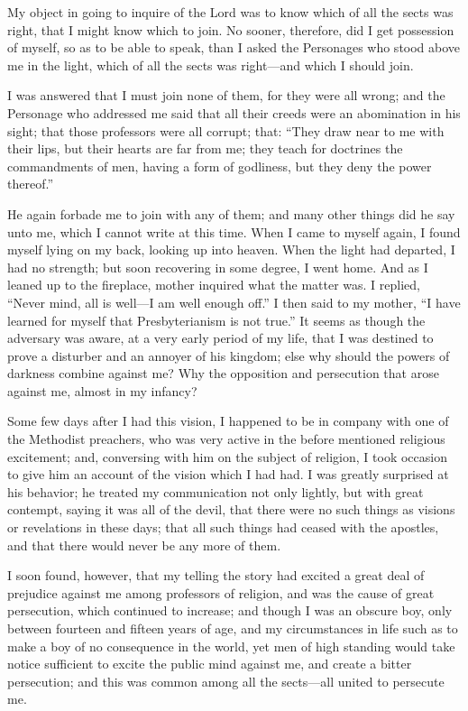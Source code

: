 My object in going to inquire of the Lord was to know which of all the sects was right, that I
might know which to join. No sooner, therefore, did I get possession of myself, so as to be
able to speak, than I asked the Personages who stood above me in the light, which of all the
sects was right—and which I should join.

I was answered that I must join none of them, for they were all wrong; and the Personage
who addressed me said that all their creeds were an abomination in his sight; that those
professors were all corrupt; that: ``They draw near to me with their lips, but their hearts are
far from me; they teach for doctrines the commandments of men, having a form of godliness,
but they deny the power thereof.''

He again forbade me to join with any of them; and many other things did he say unto me,
which I cannot write at this time. When I came to myself again, I found myself lying on my
back, looking up into heaven. When the light had departed, I had no strength; but soon
recovering in some degree, I went home. And as I leaned up to the fireplace, mother inquired
what the matter was. I replied, ``Never mind, all is well—I am well enough off.'' I then said to
my mother, ``I have learned for myself that Presbyterianism is not true.'' It seems as though
the adversary was aware, at a very early period of my life, that I was destined to prove a
disturber and an annoyer of his kingdom; else why should the powers of darkness combine
against me? Why the opposition and persecution that arose against me, almost in my
infancy?

Some few days after I had this vision, I happened to be in company with one of the
Methodist preachers, who was very active in the before mentioned religious excitement; and,
conversing with him on the subject of religion, I took occasion to give him an account of the
vision which I had had. I was greatly surprised at his behavior; he treated my communication
not only lightly, but with great contempt, saying it was all of the devil, that there were no
such things as visions or revelations in these days; that all such things had ceased with the
apostles, and that there would never be any more of them.

I soon found, however, that my telling the story had excited a great deal of prejudice against
me among professors of religion, and was the cause of great persecution, which continued to
increase; and though I was an obscure boy, only between fourteen and fifteen years of age,
and my circumstances in life such as to make a boy of no consequence in the world, yet men
of high standing would take notice sufficient to excite the public mind against me, and create
a bitter persecution; and this was common among all the sects—all united to persecute me.

